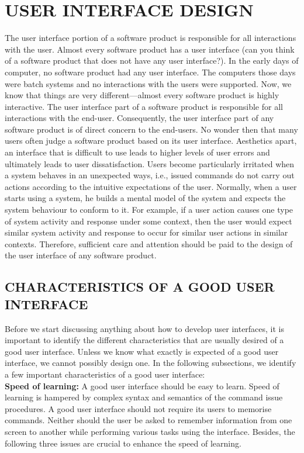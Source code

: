 \documentclass[12pt]{article}
\begin{document}
\section{USER INTERFACE DESIGN}
The user interface portion of a software product is responsible for all
interactions with the user. Almost every software product has a user
interface (can you think of a software product that does not have any
user interface?). In the early days of computer, no software product had
any user interface. The computers those days were batch systems and
no interactions with the users were supported. Now, we know that
things are very different—almost every software product is highly
interactive. The user interface part of a software product is responsible
for all interactions with the end-user. Consequently, the user interface
part of any software product is of direct concern to the end-users. No
wonder then that many users often judge a software product based on
its user interface. Aesthetics apart, an interface that is difficult to use
leads to higher levels of user errors and ultimately leads to user
dissatisfaction. Users become particularly irritated when a system
behaves in an unexpected ways, i.e., issued commands do not carry out
actions according to the intuitive expectations of the user. Normally,
when a user starts using a system, he builds a mental model of the
system and expects the system behaviour to conform to it. For
example, if a user action causes one type of system activity and
response under some context, then the user would expect similar
system activity and response to occur for similar user actions in similar
contexts. Therefore, sufficient care and attention should be paid to the
design of the user interface of any software product.

\subsection{ CHARACTERISTICS OF A GOOD USER INTERFACE}
Before we start discussing anything about how to develop user
interfaces, it is important to identify the different characteristics that
are usually desired of a good user interface. Unless we know what
exactly is expected of a good user interface, we cannot possibly design
one. In the following subsections, we identify a few important
characteristics of a good user interface:\\
\textbf{Speed of learning:} A good user interface should be easy to learn. Speed of
learning is hampered by complex syntax and semantics of the command issue
procedures. A good user interface should not require its users to memorise
commands. Neither should the user be asked to remember information from
one screen to another while performing various tasks using the interface.
Besides, the following three issues are crucial to enhance the speed of
learning.
\end{document}
